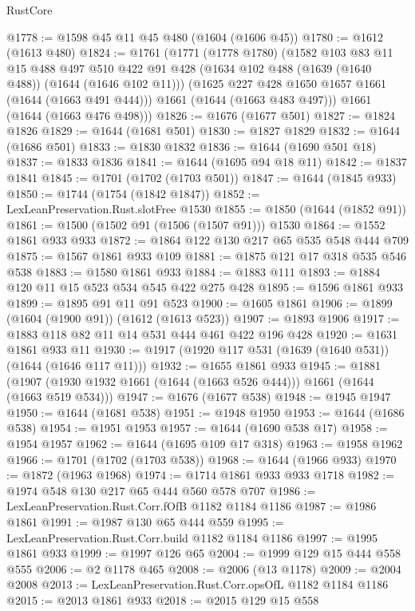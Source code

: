 \begin{lexlean}{RustCore}
\begin{coremodule}
@1778 := @1598 @45 @11 @45 @480 (@1604 (@1606 @45))
@1780 := @1612 (@1613 @480)
@1824 := @1761
    (@1771
      (@1778 @1780)
      (@1582
        @103
        @83
        @11
        @15
        @488
        @497
        @510
        @422
        @91
        @428
        (@1634 @102 @488 (@1639 (@1640 @488)) (@1644 (@1646 @102 @11)))
        (@1625 @227 @428 @1650 @1657 @1661 (@1644 (@1663 @491 @444)))
        @1661
        (@1644 (@1663 @483 @497)))
      @1661
      (@1644 (@1663 @476 @498)))
@1826 := @1676 (@1677 @501)
@1827 := @1824 @1826
@1829 := @1644 (@1681 @501)
@1830 := @1827 @1829
@1832 := @1644 (@1686 @501)
@1833 := @1830 @1832
@1836 := @1644 (@1690 @501 @18)
@1837 := @1833 @1836
@1841 := @1644 (@1695 @94 @18 @11)
@1842 := @1837 @1841
@1845 := @1701 (@1702 (@1703 @501))
@1847 := @1644 (@1845 @933)
@1850 := @1744 (@1754 (@1842 @1847))
@1852 := LexLeanPreservation.Rust.slotFree @1530
@1855 := @1850 (@1644 (@1852 @91))
@1861 := @1500 (@1502 @91 (@1506 (@1507 @91))) @1530
@1864 := @1552 @1861 @933 @933
@1872 := @1864 @122 @130 @217 @65 @535 @548 @444 @709
@1875 := @1567 @1861 @933 @109
@1881 := @1875 @121 @17 @318 @535 @546 @538
@1883 := @1580 @1861 @933
@1884 := @1883 @111
@1893 := @1884 @120 @11 @15 @523 @534 @545 @422 @275 @428
@1895 := @1596 @1861 @933
@1899 := @1895 @91 @11 @91 @523
@1900 := @1605 @1861
@1906 := @1899 (@1604 (@1900 @91)) (@1612 (@1613 @523))
@1907 := @1893 @1906
@1917 := @1883 @118 @82 @11 @14 @531 @444 @461 @422 @196 @428
@1920 := @1631 @1861 @933 @11
@1930 := @1917 (@1920 @117 @531 (@1639 (@1640 @531)) (@1644 (@1646 @117 @11)))
@1932 := @1655 @1861 @933
@1945 := @1881 (@1907 (@1930 @1932 @1661 (@1644 (@1663 @526 @444))) @1661 (@1644 (@1663 @519 @534)))
@1947 := @1676 (@1677 @538)
@1948 := @1945 @1947
@1950 := @1644 (@1681 @538)
@1951 := @1948 @1950
@1953 := @1644 (@1686 @538)
@1954 := @1951 @1953
@1957 := @1644 (@1690 @538 @17)
@1958 := @1954 @1957
@1962 := @1644 (@1695 @109 @17 @318)
@1963 := @1958 @1962
@1966 := @1701 (@1702 (@1703 @538))
@1968 := @1644 (@1966 @933)
@1970 := @1872 (@1963 @1968)
@1974 := @1714 @1861 @933 @933 @1718
@1982 := @1974 @548 @130 @217 @65 @444 @560 @578 @707
@1986 := LexLeanPreservation.Rust.Corr.fOfB @1182 @1184 @1186
@1987 := @1986 @1861
@1991 := @1987 @130 @65 @444 @559
@1995 := LexLeanPreservation.Rust.Corr.build @1182 @1184 @1186
@1997 := @1995 @1861 @933
@1999 := @1997 @126 @65
@2004 := @1999 @129 @15 @444 @558 @555
@2006 := @2 @1178 @465
@2008 := @2006 (@13 @1178)
@2009 := @2004 @2008
@2013 := LexLeanPreservation.Rust.Corr.opsOfL @1182 @1184 @1186
@2015 := @2013 @1861 @933
@2018 := @2015 @129 @15 @558

\end{coremodule}
\end{lexlean}

